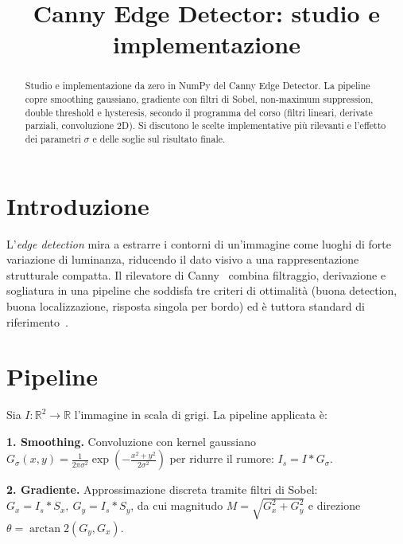 \documentclass[conference,9pt]{IEEEtran}
\begin{document}
\title{Canny Edge Detector: studio e implementazione}

\author{
}

\maketitle

\begin{abstract}
Studio e implementazione da zero in NumPy del Canny Edge Detector. La pipeline
copre smoothing gaussiano, gradiente con filtri di Sobel, non-maximum
suppression, double threshold e hysteresis, secondo il programma del corso
(filtri lineari, derivate parziali, convoluzione 2D). Si discutono le scelte
implementative pi\`u rilevanti e l'effetto dei parametri $\sigma$ e delle
soglie sul risultato finale.
\end{abstract}

\section{Introduzione}
L'\textit{edge detection} mira a estrarre i contorni di un'immagine come
luoghi di forte variazione di luminanza, riducendo il dato visivo a una
rappresentazione strutturale compatta. Il rilevatore di
Canny~\cite{canny1986} combina filtraggio, derivazione e sogliatura in una
pipeline che soddisfa tre criteri di ottimalit\`a (buona detection, buona
localizzazione, risposta singola per bordo) ed \`e tuttora standard di
riferimento~\cite{gonzalez}.

\section{Pipeline}
Sia $I:\mathbb{R}^2\to\mathbb{R}$ l'immagine in scala di grigi. La pipeline
applicata \`e:

\textbf{1. Smoothing.} Convoluzione con kernel gaussiano
$G_\sigma(x,y)=\frac{1}{2\pi\sigma^2}\exp\!\left(-\frac{x^2+y^2}{2\sigma^2}\right)$
per ridurre il rumore: $I_s = I * G_\sigma$.

\textbf{2. Gradiente.} Approssimazione discreta tramite filtri di Sobel:
$G_x = I_s * S_x,\ G_y = I_s * S_y$, da cui magnitudo
$M=\sqrt{G_x^2+G_y^2}$ e direzione $\theta=\arctan2(G_y,G_x)$.
\end{document}
